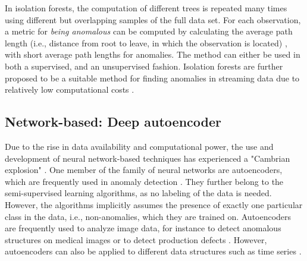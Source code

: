 \documentclass[conference]{IEEEtran}
\begin{document}

In isolation forests, the computation of different trees is repeated many times using different but overlapping samples of the full data set. For each observation, a metric for \textit{being anomalous} can be computed by calculating the average path length (i.e., distance from root to leave, in which the observation is located) \cite{liu2008isolation}, with short average path lengths for anomalies. The method can either be used in both a supervised, and an unsupervised fashion. Isolation forests are further proposed to be a suitable method for finding anomalies in streaming data due to relatively low computational costs \cite{mercader2020automatic}.


\subsection{Network-based: Deep autoencoder} \label{sec:auto}

Due to the rise in data availability and computational power, the use and development of neural network-based techniques has experienced a "Cambrian explosion" \cite{aggarwal2018neural}. One member of the family of neural networks are autoencoders, which are frequently used in anomaly detection \cite{geron2019hands}. They further belong to the semi-supervised learning algorithms, as no labeling of the data is needed. However, the algorithms implicitly assumes the presence of exactly one particular class in the data, i.e., non-anomalies, which they are trained on. Autoencoders are frequently used to analyze image data, for instance to detect anomalous structures on medical images \cite{sato2018primitive} or to detect production defects \cite{carrera2016defect}. However, autoencoders can also be applied to different data structures such as time series \cite{zhang2019time}.
\end{document}
